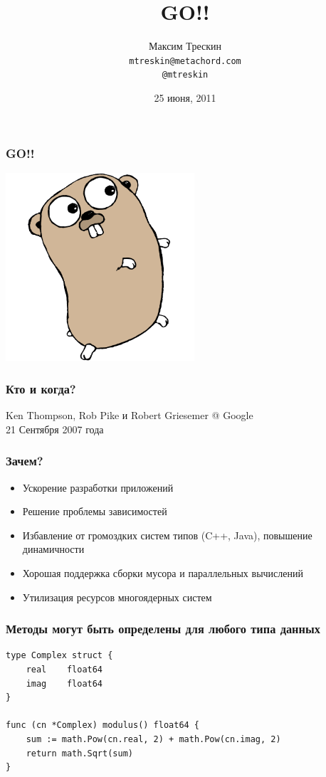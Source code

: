 \documentclass{beamer}
\title{GO!!}
\author{Максим Трескин\\ \texttt{mtreskin@metachord.com} \\ \texttt{@mtreskin}}
\date[2011.06.25]{25 июня, 2011}
\begin{document}
\begin{frame}
  \titlepage
\end{frame}


\begin{frame}
  \frametitle{GO!!}
  \begin{minipage}[t]{90px}
    \hfil
    \includegraphics[height=7cm]{gopher_c.png}
    \hfil
  \end{minipage}
\end{frame}

\begin{frame}
  \frametitle{Кто и когда?}
  Ken Thompson, Rob Pike и Robert Griesemer @ Google\\
  21 Сентября 2007 года
\end{frame}

\begin{frame}
  \frametitle{Зачем?}
  \begin{itemize}
  \item Ускорение разработки приложений
  \item Решение проблемы зависимостей
  \item Избавление от громоздких систем типов (C++, Java), повышение динамичности
  \item Хорошая поддержка сборки мусора и параллельных вычислений
  \item Утилизация ресурсов многоядерных систем
  \end{itemize}
\end{frame}



\begin{frame}[fragile]
  \frametitle{Методы могут быть определены для любого типа данных}
\begin{verbatim}
type Complex struct {
    real    float64
    imag    float64
}

func (cn *Complex) modulus() float64 {
    sum := math.Pow(cn.real, 2) + math.Pow(cn.imag, 2)
    return math.Sqrt(sum)
}

\end{verbatim}
\end{frame}
\end{document}
